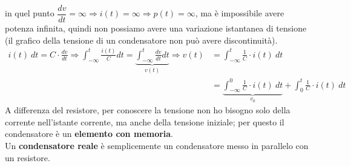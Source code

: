 \documentclass{article}
\begin{document}
in quel punto $\dfrac{dv}{dt}=\infty \Rightarrow i(t)=\infty \Rightarrow p(t) = \infty$, ma è impossibile avere potenza infinita, quindi non possiamo avere una variazione istantanea di tensione (il grafico della tensione di un condensatore non può avere discontinuità).
\begin{align*}
    i(t) \ dt = C \cdot \frac{dv}{dt} \Longrightarrow \int_{- \infty}^{t} \frac{i(t)}{C} dt = \underbrace{\int_{- \infty}^{t} \frac{dv}{dt}dt}_{v(t)} \Longrightarrow  v(t) &= \int_{- \infty}^{t} \frac{1}{C} \cdot i(t) \ dt\\ 
    &= \underbrace{\int_{- \infty}^{0} \frac{1}{C} \cdot i(t) \ dt}_{v_0} + \int_{0}^{t} \frac{1}{C} \cdot i(t) \ dt
\end{align*}
A differenza del resistore, per conoscere la tensione non ho bisogno solo della corrente nell'istante corrente, ma anche della tensione iniziale; per questo il condensatore è un \textbf{elemento con memoria}.
\vspace*{0.2cm}\\
Un \textbf{condensatore reale} è semplicemente un condensatore messo in parallelo con un resistore.
\end{document}
